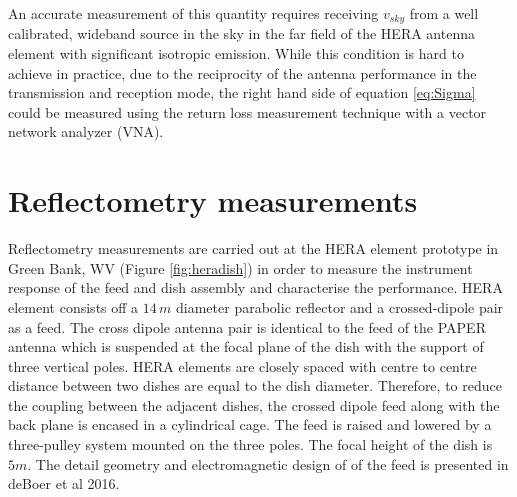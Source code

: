 \documentclass[twocolumn]{emulateapj}
\newcommand{\volt}{{v}}
\newcommand{\dfngexp}{{e^{2\pi i\nu \Delta \tau}}}
\begin{document}

An accurate measurement of this quantity requires receiving $v_{sky}$ from a well calibrated, wideband source in the sky in the far field of the HERA antenna element with significant isotropic emission. While this condition is hard to achieve in practice, due to the reciprocity of the antenna performance in the transmission and reception mode, the right hand side of equation \ref{eq:Sigma} could be measured using the return loss measurement technique with a vector network analyzer (VNA). \\

\section{\textbf{Reflectometry measurements}} 

Reflectometry measurements are carried out at the HERA element prototype in Green
Bank, WV (Figure \ref{fig:heradish}) in order to measure the instrument response of the feed and dish assembly and characterise the performance.  HERA element consists off a $14\,m$ diameter
parabolic reflector and a crossed-dipole pair as a feed. The cross dipole antenna pair is identical to the feed of the PAPER antenna which is suspended at the focal plane of the dish with the support of three vertical poles. HERA elements are closely spaced with centre to centre distance between two dishes are equal to the dish diameter. Therefore, to reduce the coupling between the adjacent dishes, the crossed dipole feed along with the back plane is encased in a cylindrical cage. The feed is raised and
lowered by a three-pulley system mounted on the three poles. The focal height of the dish is $5m$.  The detail geometry and electromagnetic design of of the feed is presented in deBoer et al 2016. \\
\end{document}
